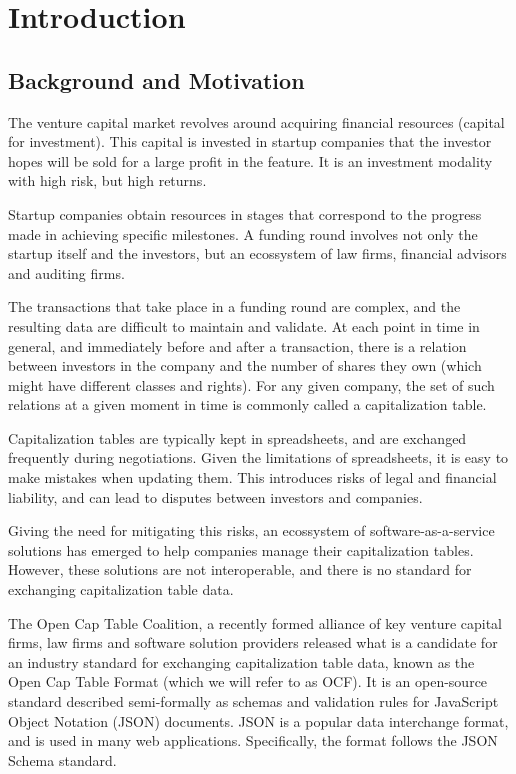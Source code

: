 \chapter{Introduction}

\section{Background and Motivation}

The venture capital market revolves around acquiring financial resources (capital for investment). This capital is invested in startup companies that the investor hopes will be sold for a large profit in the feature. It is an investment modality with high risk, but high returns. 

Startup companies obtain resources in stages that correspond to the progress made in achieving specific milestones. A funding round involves not only the startup itself and the investors, but an ecossystem of law firms, financial advisors and auditing firms. 

The transactions that take place in a funding round are complex, and the resulting data are difficult to maintain and validate. At each point in time in general, and immediately before and after a transaction, there is a relation between investors in the company and the number of shares they own (which might have different classes and rights). For any given company, the set of such relations at a given moment in time is commonly called a capitalization table.

Capitalization tables are typically kept in spreadsheets, and are exchanged frequently during negotiations. Given the limitations of spreadsheets, it is easy to make mistakes when updating them. This introduces risks of legal and financial liability, and can lead to disputes between investors and companies.

Giving the need for mitigating this risks, an ecossystem of software-as-a-service solutions has emerged to help companies manage their capitalization tables. However, these solutions are not interoperable, and there is no standard for exchanging capitalization table data.

The Open Cap Table Coalition\cite{opencaptablecoalitionOpenTable}, a recently formed alliance of key venture capital firms, law firms and software solution providers released what is a candidate for an industry standard for exchanging capitalization table data, known as the Open Cap Table Format\cite{OCTForma62:online} (which we will refer to as OCF). It is an open-source standard described semi-formally as schemas and validation rules for JavaScript Object Notation (JSON) documents. JSON is a popular data interchange format, and is used in many web applications. Specifically, the format follows the JSON Schema standard.

